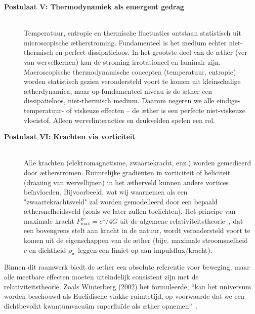 \begin{description}
    \item[\textbf{Postulaat V: Thermodynamiek als emergent gedrag}] \hfill \\
    Temperatuur, entropie en thermische fluctuaties ontstaan statistisch uit microscopische ætherstroming. Fundamenteel is het medium echter niet-thermisch en perfect dissipatieloos. In het grootste deel van de æther (ver van wervelkernen) kan de stroming irrotationeel en laminair zijn. Macroscopische thermodynamische concepten (temperatuur, entropie) worden statistisch gezien verondersteld voort te komen uit kleinschalige ætherdynamica, maar op fundamenteel niveau is de æther een dissipatieloos, niet-thermisch medium. Daarom negeren we alle eindige-temperatuur- of viskeuze effecten – de æther is een perfecte niet-viskeuze vloeistof. Alleen wervelinteracties en drukvelden spelen een rol.

    \item[\textbf{Postulaat VI: Krachten via vorticiteit}] \hfill \\
    Alle krachten (elektromagnetisme, zwaartekracht, enz.) worden gemedieerd door ætherstromen.
    Ruimtelijke gradiënten in vorticiteit of heliciteit (draaiing van wervellijnen) in het ætherveld kunnen andere vortices beïnvloeden. Bijvoorbeeld, wat wij waarnemen als een $\text{"zwaartekrachtsveld"}$ zal worden gemodelleerd door een bepaald æthersnelheidsveld (zoals we later zullen toelichten). Het principe van maximale kracht $ F^{\text{gr}}_{\text{max}} = c^4 / 4 G $ uit de algemene relativiteitstheorie~\cite{Schiller2022-maxforce}, dat een bovengrens stelt aan kracht in de natuur, wordt verondersteld voort te komen uit de eigenschappen van de æther (bijv. maximale stroomsnelheid $c$ en dichtheid $\rho_\text{\ae}$ leggen een limiet op aan impulsflux/kracht).
\end{description}



Binnen dit raamwerk biedt de æther een absolute referentie voor beweging, maar alle meetbare effecten moeten uiteindelijk consistent zijn met de relativiteitstheorie. Zoals Winterberg (2002) het formuleerde, ``kan het universum worden beschouwd als Euclidische vlakke ruimtetijd, op voorwaarde dat we een dichtbevolkt kwantumvacuüm superfluïde als æther opnemen''~\cite{Winterberg2002-PlanckÆther}.


